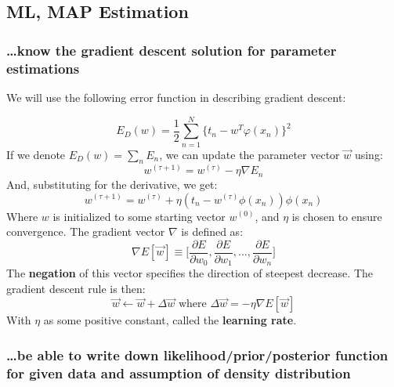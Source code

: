 \documentclass[11pt]{article} %
\begin{document}
\subsection{ML, MAP Estimation}

\subsubsection{\ldots know the gradient descent solution for parameter estimations}

We will use the following error function in describing gradient descent:

\begin{equation}
E_D(w) = \frac{1}{2} \sum_{n=1}^{N} \big\{ t_n-w^T\varphi(x_n)\big\}^2
\end{equation}
If we denote $E_D(w) = \sum_nE_n$, we can update the parameter vector $\vec{w}$ using:
\begin{equation}
w^{(\tau+1)} = w^{(\tau)} - \eta \nabla E_n
\end{equation}
And, substituting for the derivative, we get:
\begin{equation}
w^{(\tau+1)} = w^{(\tau)} + \eta(t_n - w^{(\tau)}\phi(x_n))\phi(x_n)
\end{equation}
Where $w$ is initialized to some starting vector $w^{(0)}$, and $\eta$ is chosen to ensure convergence. The gradient vector $\nabla$ is defined as:
\begin{equation}
\nabla E[\vec{w}] \equiv \Bigg[ \frac{\partial E}{\partial w_0}, \frac{\partial E}{\partial w_1}, \ldots, \frac{\partial E}{\partial w_n} \Bigg]
\end{equation}
The {\bf negation} of this vector specifies the direction of steepest decrease. The gradient descent rule is then:
\begin{equation}
\vec{w} \leftarrow \vec{w} + \Delta \vec{w} \text{ where } \Delta \vec{w} = - \eta \nabla E[\vec{w}]
\end{equation}
With $\eta$ as some positive constant, called the {\bf learning rate}.

\subsubsection{\ldots be able to write down likelihood/prior/posterior function for given data and assumption of density distribution}
\end{document}
